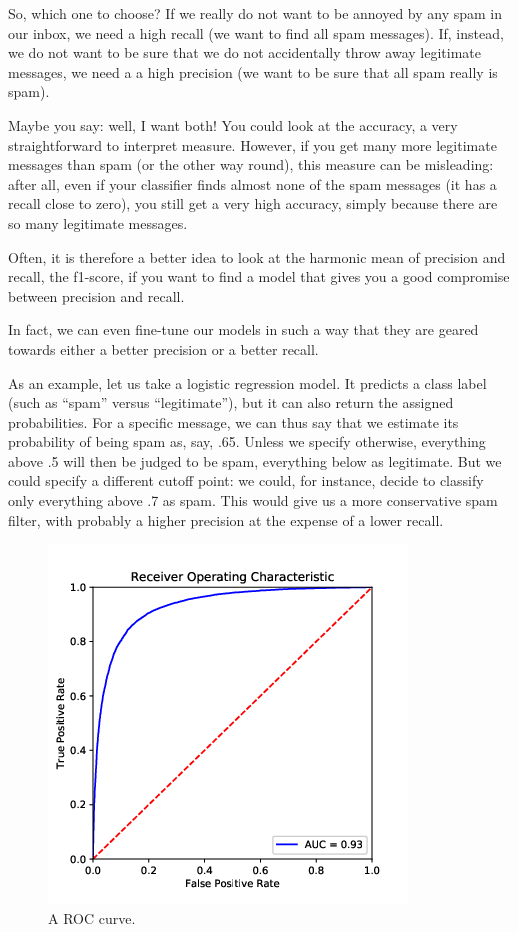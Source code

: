 So, which one to choose?  If we really do not want to be annoyed by
any spam in our inbox, we need a high recall (we want to find all spam
messages). If, instead, we do not want to be sure that we do not
accidentally throw away legitimate messages, we need a a high
precision (we want to be sure that all spam really is spam).

Maybe you say: well, I want both!  You could look at the accuracy, a
very straightforward to interpret measure. However, if you get many
more legitimate messages than spam (or the other way round), this
measure can be misleading: after all, even if your classifier finds
almost none of the spam messages (it has a recall close to zero), you
still get a very high accuracy, simply because there are so many
legitimate messages.

Often, it is therefore a better idea to look at the harmonic mean of
precision and recall, the f1-score, if you want to find a model that
gives you a good compromise between precision and recall.


In fact, we can even fine-tune our models in such a way that they are
geared towards either a better precision or a better recall.

As an example, let us take a logistic regression model. It predicts a
class label (such as ``spam'' versus ``legitimate''), but it can also
return the assigned probabilities. For a specific message, we can thus
say that we estimate its probability of being spam as, say, .65.
Unless we specify otherwise, everything above .5 will then be judged
to be spam, everything below as legitimate. But we could specify a
different cutoff point: we could, for instance, decide to classify
only everything above .7 as spam. This would give us a more
conservative spam filter, with probably a higher precision at the
expense of a lower recall.

\begin{figure} 
\centering
\includegraphics[width=0.4\linewidth]{figures/ch09_roccurve}
\caption{A ROC curve.}
\label{fig:roccurve}
\end{figure}

